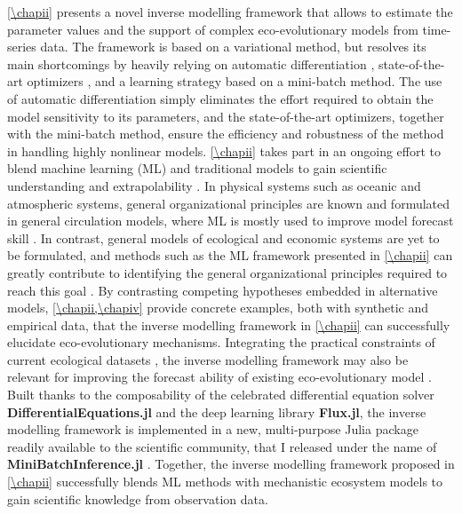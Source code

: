 %
\cref{\chapii} presents a novel inverse modelling framework that allows to estimate the parameter values and the support of complex eco-evolutionary models from time-series data.
% 
The framework is based on a variational method, but resolves its main shortcomings by heavily relying on automatic differentiation \citep{Rackauckas2020a}, state-of-the-art optimizers \citep{Kingma2014}, and a learning strategy based on a mini-batch method. 
% 
The use of automatic differentiation simply eliminates the effort required to obtain the model sensitivity to its parameters, and the state-of-the-art optimizers, together with the mini-batch method, ensure the efficiency and robustness of the method in handling highly nonlinear models.
% 
\cref{\chapii} takes part in an ongoing effort to blend machine learning (ML) and traditional models to gain scientific understanding and extrapolability \citep{Karpatne2017,Rackauckas2020a,Schneider2017,Rolnick2023,Kashinath2021,Yazdani2020,Raissi2019}. 
% 
In physical systems such as oceanic and atmospheric systems, general organizational principles are known and formulated in general circulation models, where ML is mostly used to improve model forecast skill \citep{Schneider2017}. In contrast, general models of ecological and economic systems are yet to be formulated, and methods such as the ML framework presented in \cref{\chapii} can greatly contribute to identifying the general organizational principles required to reach this goal \citep{Karpatne2017}. 
% 
By contrasting competing hypotheses embedded in alternative models, \cref{\chapii,\chapiv} provide concrete examples, both with synthetic and empirical data, that the inverse modelling framework in \cref{\chapii} can successfully elucidate eco-evolutionary mechanisms.
Integrating the practical constraints of current ecological datasets \citep{Dornelas2018}, the inverse modelling framework may also be relevant for improving the forecast ability of existing eco-evolutionary model \citep{Norberg2012}.
% 
Built thanks to the composability of the celebrated differential equation solver \textbf{DifferentialEquations.jl} and the deep learning library \textbf{Flux.jl}, the inverse modelling framework is implemented in a new, multi-purpose Julia package readily available to the scientific community, that I released under the name of \textbf{MiniBatchInference.jl} \citep{MiniBatchInference}.
% 
Together, the inverse modelling framework proposed in \cref{\chapii} successfully blends ML methods with mechanistic ecosystem models to gain scientific knowledge from observation data. 

